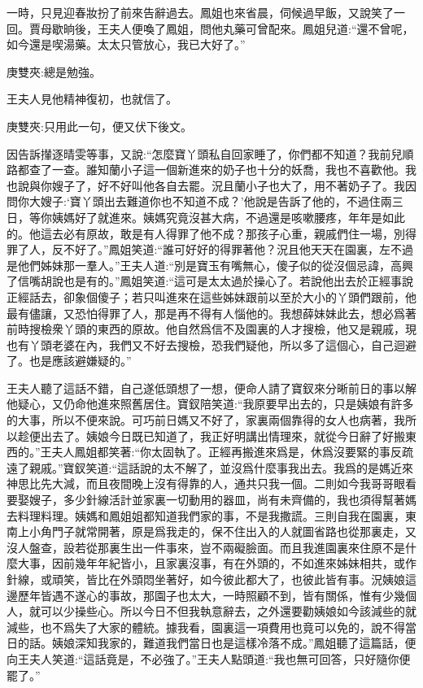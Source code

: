 \begin{parag}
    一時，只見迎春妝扮了前來告辭過去。鳳姐也來省晨，伺候過早飯，又說笑了一回。賈母歇晌後，王夫人便喚了鳳姐，問他丸藥可曾配來。鳳姐兒道:“還不曾呢，如今還是喫湯藥。太太只管放心，我已大好了。”\begin{note}庚雙夾:總是勉強。\end{note}王夫人見他精神復初，也就信了。\begin{note}庚雙夾:只用此一句，便又伏下後文。\end{note}因告訴攆逐晴雯等事，又說:“怎麼寶丫頭私自回家睡了，你們都不知道？我前兒順路都查了一查。誰知蘭小子這一個新進來的奶子也十分的妖喬，我也不喜歡他。我也說與你嫂子了，好不好叫他各自去罷。況且蘭小子也大了，用不著奶子了。我因問你大嫂子:‘寶丫頭出去難道你也不知道不成？’他說是告訴了他的，不過住兩三日，等你姨媽好了就進來。姨媽究竟沒甚大病，不過還是咳嗽腰疼，年年是如此的。他這去必有原故，敢是有人得罪了他不成？那孩子心重，親戚們住一場，別得罪了人，反不好了。”鳳姐笑道:“誰可好好的得罪著他？況且他天天在園裏，左不過是他們姊妹那一羣人。”王夫人道:“別是寶玉有嘴無心，傻子似的從沒個忌諱，高興了信嘴胡說也是有的。”鳳姐笑道:“這可是太太過於操心了。若說他出去於正經事說正經話去，卻象個傻子；若只叫進來在這些姊妹跟前以至於大小的丫頭們跟前，他最有儘讓，又恐怕得罪了人，那是再不得有人惱他的。我想薛妹妹此去，想必爲著前時搜檢衆丫頭的東西的原故。他自然爲信不及園裏的人才搜檢，他又是親戚，現也有丫頭老婆在內，我們又不好去搜檢，恐我們疑他，所以多了這個心，自己迴避了。也是應該避嫌疑的。”
\end{parag}


\begin{parag}
    王夫人聽了這話不錯，自己遂低頭想了一想，便命人請了寶釵來分晰前日的事以解他疑心，又仍命他進來照舊居住。寶釵陪笑道:“我原要早出去的，只是姨娘有許多的大事，所以不便來說。可巧前日媽又不好了，家裏兩個靠得的女人也病著，我所以趁便出去了。姨娘今日既已知道了，我正好明講出情理來，就從今日辭了好搬東西的。”王夫人鳳姐都笑著:“你太固執了。正經再搬進來爲是，休爲沒要緊的事反疏遠了親戚。”寶釵笑道:“這話說的太不解了，並沒爲什麼事我出去。我爲的是媽近來神思比先大減，而且夜間晚上沒有得靠的人，通共只我一個。二則如今我哥哥眼看要娶嫂子，多少針線活計並家裏一切動用的器皿，尚有未齊備的，我也須得幫著媽去料理料理。姨媽和鳳姐姐都知道我們家的事，不是我撒謊。三則自我在園裏，東南上小角門子就常開著，原是爲我走的，保不住出入的人就圖省路也從那裏走，又沒人盤查，設若從那裏生出一件事來，豈不兩礙臉面。而且我進園裏來住原不是什麼大事，因前幾年年紀皆小，且家裏沒事，有在外頭的，不如進來姊妹相共，或作針線，或頑笑，皆比在外頭悶坐著好，如今彼此都大了，也彼此皆有事。況姨娘這邊歷年皆遇不遂心的事故，那園子也太大，一時照顧不到，皆有關係，惟有少幾個人，就可以少操些心。所以今日不但我執意辭去，之外還要勸姨娘如今該減些的就減些，也不爲失了大家的體統。據我看，園裏這一項費用也竟可以免的，說不得當日的話。姨娘深知我家的，難道我們當日也是這樣冷落不成。”鳳姐聽了這篇話，便向王夫人笑道:“這話竟是，不必強了。”王夫人點頭道:“我也無可回答，只好隨你便罷了。”
\end{parag}


